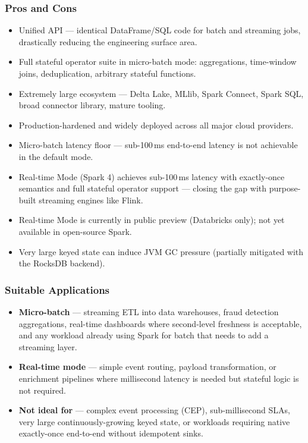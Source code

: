 \subsubsection{Pros and Cons}

\begin{itemize}
  \item[\textbf{+}] Unified API — identical DataFrame/SQL code for batch and streaming jobs, drastically reducing the engineering surface area.
  \item[\textbf{+}] Full stateful operator suite in micro-batch mode: aggregations, time-window joins, deduplication, arbitrary stateful functions.
  \item[\textbf{+}] Extremely large ecosystem — Delta Lake, MLlib, Spark Connect, Spark SQL, broad connector library, mature tooling.
  \item[\textbf{+}] Production-hardened and widely deployed across all major cloud providers.
  \item[\textbf{--}] Micro-batch latency floor — sub-100\,ms end-to-end latency is not achievable in the default mode.
  \item[\textbf{+}] Real-time Mode (Spark 4) achieves sub-100\,ms latency with exactly-once semantics and full stateful operator support — closing the gap with purpose-built streaming engines like Flink.
  \item[\textbf{--}] Real-time Mode is currently in public preview (Databricks only); not yet available in open-source Spark.
  \item[\textbf{--}] Very large keyed state can induce JVM GC pressure (partially mitigated with the RocksDB backend).
\end{itemize}

\subsubsection{Suitable Applications}

\begin{itemize}
  \item \textbf{Micro-batch} — streaming ETL into data warehouses, fraud detection aggregations, real-time dashboards where second-level freshness is acceptable, and any workload already using Spark for batch that needs to add a streaming layer.
  \item \textbf{Real-time mode} — simple event routing, payload transformation, or enrichment pipelines where millisecond latency is needed but stateful logic is not required.
  \item \textbf{Not ideal for} — complex event processing (CEP), sub-millisecond SLAs, very large continuously-growing keyed state, or workloads requiring native exactly-once end-to-end without idempotent sinks.
\end{itemize}
